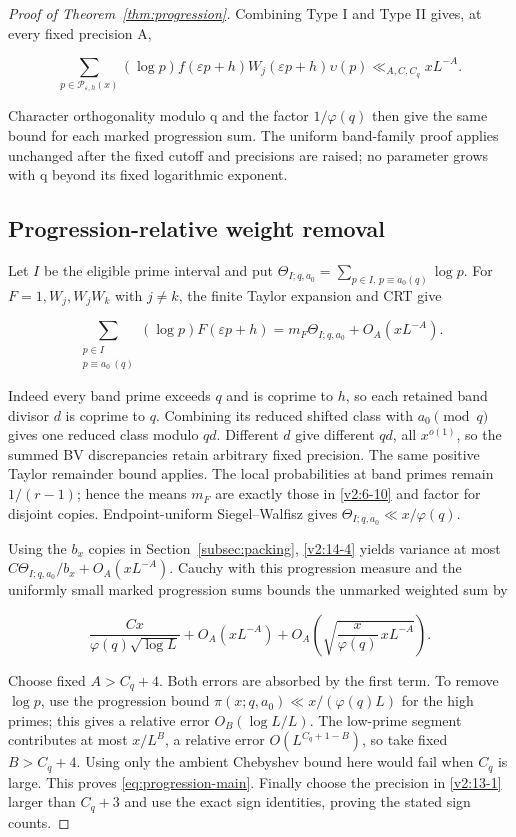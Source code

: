 \documentclass[11pt]{article}
\theoremstyle{definition}
\theoremstyle{remark}
\numberwithin{equation}{section}
\begin{document}
\begin{proof}[Proof of Theorem~\ref{thm:progression}]
Combining Type I and Type II gives, at every fixed precision A,


\begin{equation}
\sum_{p\in\mathcal P_{\varepsilon,h}(x)}(\log p)f(\varepsilon p+h)W_j(\varepsilon p+h)\upsilon(p)
\ll_{A,C,C_q}xL^{-A}.
\end{equation}


Character orthogonality modulo q and the factor $1/\varphi(q)$ then give the same bound for each marked progression sum. The uniform band-family proof applies unchanged after the fixed cutoff and precisions are raised; no parameter grows with q beyond its fixed logarithmic exponent.

\subsection*{Progression-relative weight removal}
Let $I$ be the eligible prime interval and put $\Theta_{I;q,a_0}=\sum_{p\in I,\,p\equiv a_0(q)}\log p$. For $F=1,W_j,W_jW_k$ with $j\ne k$, the finite Taylor expansion and CRT give


\begin{equation}\label{v2:14-4}
\sum_{\substack{p\in I\\p\equiv a_0\ (q)}}(\log p)F(\varepsilon p+h)
=m_F\Theta_{I;q,a_0}+O_A(xL^{-A}).
\end{equation}


Indeed every band prime exceeds $q$ and is coprime to $h$, so each retained band divisor $d$ is coprime to $q$. Combining its reduced shifted class with $a_0\pmod q$ gives one reduced class modulo $qd$. Different $d$ give different $qd$, all $x^{o(1)}$, so the summed BV discrepancies retain arbitrary fixed precision. The same positive Taylor remainder bound applies. The local probabilities at band primes remain $1/(r-1)$; hence the means $m_F$ are exactly those in \eqref{v2:6-10} and factor for disjoint copies. Endpoint-uniform Siegel–Walfisz gives $\Theta_{I;q,a_0}\ll x/\varphi(q)$.

Using the $b_x$ copies in Section~\ref{subsec:packing}, \eqref{v2:14-4} yields variance at most $C\Theta_{I;q,a_0}/b_x+O_A(xL^{-A})$. Cauchy with this progression measure and the uniformly small marked progression sums bounds the unmarked weighted sum by


\begin{equation}
\frac{Cx}{\varphi(q)\sqrt{\log L}}+O_A(xL^{-A})
+O_A\left(\sqrt{\frac{x}{\varphi(q)}\,xL^{-A}}\right).
\end{equation}


Choose fixed $A>C_q+4$. Both errors are absorbed by the first term. To remove $\log p$, use the progression bound $\pi(x;q,a_0)\ll x/(\varphi(q)L)$ for the high primes; this gives a relative error $O_B(\log L/L)$. The low-prime segment contributes at most $x/L^B$, a relative error $O(L^{C_q+1-B})$, so take fixed $B>C_q+4$. Using only the ambient Chebyshev bound here would fail when $C_q$ is large. This proves \eqref{eq:progression-main}. Finally choose the precision in \eqref{v2:13-1} larger than $C_q+3$ and use the exact sign identities, proving the stated sign counts. 

\end{proof}
\end{document}
